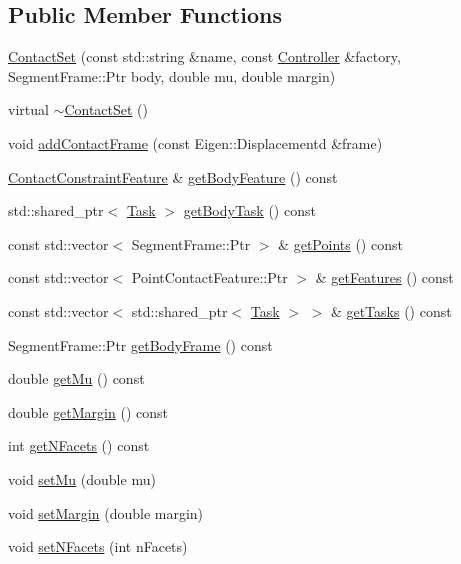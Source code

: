 \subsection*{Public Member Functions}
\begin{DoxyCompactItemize}
\item 
\hyperlink{classocra_1_1ContactSet_aa1bc409bbd509f1b56ab6de851102435}{Contact\+Set} (const std\+::string \&name, const \hyperlink{classocra_1_1Controller}{Controller} \&factory, Segment\+Frame\+::\+Ptr body, double mu, double margin)
\item 
virtual \hyperlink{classocra_1_1ContactSet_ad41eb11994dbd12c9fc55997428e256f}{$\sim$\+Contact\+Set} ()
\item 
void \hyperlink{classocra_1_1ContactSet_ac6b33a6ece44daaa338cdf5a761b522a}{add\+Contact\+Frame} (const Eigen\+::\+Displacementd \&frame)
\item 
\hyperlink{classocra_1_1ContactConstraintFeature}{Contact\+Constraint\+Feature} \& \hyperlink{classocra_1_1ContactSet_a5b1374104097c642972daabe91b4b963}{get\+Body\+Feature} () const
\item 
std\+::shared\+\_\+ptr$<$ \hyperlink{classocra_1_1Task}{Task} $>$ \hyperlink{classocra_1_1ContactSet_a72517a1bde5c4d5e2f686803c9a1fe5d}{get\+Body\+Task} () const
\item 
const std\+::vector$<$ Segment\+Frame\+::\+Ptr $>$ \& \hyperlink{classocra_1_1ContactSet_ab0d2830d5710e02f1807033cbc9ba956}{get\+Points} () const
\item 
const std\+::vector$<$ Point\+Contact\+Feature\+::\+Ptr $>$ \& \hyperlink{classocra_1_1ContactSet_a8f5840a62ab7b1e0c6b938bc4b7b102b}{get\+Features} () const
\item 
const std\+::vector$<$ std\+::shared\+\_\+ptr$<$ \hyperlink{classocra_1_1Task}{Task} $>$ $>$ \& \hyperlink{classocra_1_1ContactSet_a5f3b18a88fc7fd4f0de7b0bb87e40c77}{get\+Tasks} () const
\item 
Segment\+Frame\+::\+Ptr \hyperlink{classocra_1_1ContactSet_ae0b5d92cc7baddf61eaebd45ffe20ba3}{get\+Body\+Frame} () const
\item 
double \hyperlink{classocra_1_1ContactSet_a8583db2b548f1fe3467115a1f2347c5f}{get\+Mu} () const
\item 
double \hyperlink{classocra_1_1ContactSet_a7f16dde129521e94ceb0fb091f5d840f}{get\+Margin} () const
\item 
int \hyperlink{classocra_1_1ContactSet_a0fa75dacb675c0133326ba27a63d4070}{get\+N\+Facets} () const
\item 
void \hyperlink{classocra_1_1ContactSet_a54d6c7d8c1266300f8a4f6d1be754630}{set\+Mu} (double mu)
\item 
void \hyperlink{classocra_1_1ContactSet_adb5aa2d4b3463d328d4687ca352b4c04}{set\+Margin} (double margin)
\item 
void \hyperlink{classocra_1_1ContactSet_a223ef9c14b40a257d026112af1a6b279}{set\+N\+Facets} (int n\+Facets)
\end{DoxyCompactItemize}


